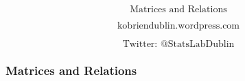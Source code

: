 \documentclass{beamer}
\begin{document}
\begin{frame}
\Large
\[ \mbox{Matrices and Relations}  \]

\Large
\[ \mbox{kobriendublin.wordpress.com}  \]

\Large
\[ \mbox{Twitter: @StatsLabDublin}  \]
\end{frame}
\begin{frame}
\frametitle{Matrices and Relations}

\end{frame}
\end{document}
